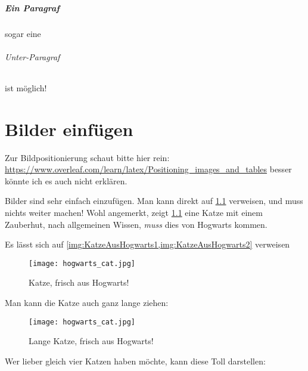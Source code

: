 \paragraph{Ein Paragraf} sogar eine
\subparagraph{Unter-Paragraf} ist möglich!


\chapter{Bilder einfügen}

Zur Bildpositionierung schaut bitte hier rein: \url{https://www.overleaf.com/learn/latex/Positioning_images_and_tables} besser könnte ich es auch nicht erklären.

Bilder sind sehr einfach einzufügen.
Man kann direkt auf \cref{img:KatzeAusHogwarts1} verweisen, und muss nichts weiter machen!
Wohl angemerkt, zeigt \cref{img:KatzeAusHogwarts1} eine Katze mit einem Zauberhut, nach allgemeinen Wissen, \textit{muss} dies von Hogwarts kommen.

Es lässt sich auf \cref{img:KatzeAusHogwarts1,img:KatzeAusHogwarts2} verweisen

\begin{figure}[H]
    \texttt{[image: hogwarts\_cat.jpg]}
    \centering
    \vspace{-5pt}
    \caption{Katze, frisch aus Hogwarts!}
    \label{img:KatzeAusHogwarts1}
\end{figure}

Man kann die Katze auch ganz lange ziehen:

\begin{figure}[H]
    \texttt{[image: hogwarts\_cat.jpg]}
    \centering
    \vspace{-5pt}
    \caption{Lange Katze, frisch aus Hogwarts!}
    \label{img:KatzeAusHogwarts2}
\end{figure}

Wer lieber gleich vier Katzen haben möchte, kann diese Toll darstellen:

